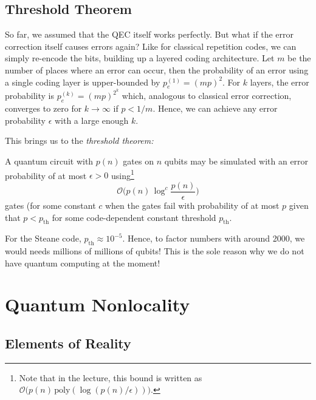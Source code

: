 	\section{Threshold Theorem}
		So far, we assumed that the \ac{QEC} itself works perfectly. But what if the error correction itself causes errors again? Like for classical repetition codes, we can simply re-encode the bits, building up a layered coding architecture. Let \(m\) be the number of places where an error can occur, then the probability of an error using a single coding layer is upper-bounded by \( p_e^{(1)} = (mp)^2 \). For \(k\) layers, the error probability is \( p_e^{(k)} = (mp)^{2^k} \) which, analogous to classical error correction, converges to zero for \(k \to \infty\) if \(p < 1/m\). Hence, we can achieve any error probability \(\epsilon\) with a large enough \(k\).

		This brings us to the \emph{threshold theorem:}
		\begin{theorem}
			A quantum circuit with \(p(n)\) gates on \(n\) qubits may be simulated with an error probability of at most \(\epsilon > 0\) using\footnote{Note that in the lecture, this bound is written as \( \mathcal{O}\bigl( p(n) \, \mathrm{poly}( \log(p(n)/\epsilon) ) \bigr) \).}
			\begin{equation}
				\mathcal{O}\Biggl( p(n) \, \log^c \frac{p(n)}{\epsilon} \Biggr)
			\end{equation}
			gates (for some constant \(c\) when the gates fail with probability of at most \(p\) given that \(p < p_\mathrm{th}\) for some code-dependent constant threshold \(p_\mathrm{th}\).
		\end{theorem}
		For the Steane code, \( p_\mathrm{th} \approx 10^{-5} \). Hence, to factor numbers with around \num{2000}, we would needs millions of millions of qubits! This is the sole reason why we do not have quantum computing at the moment!

\chapter{Quantum Nonlocality} %
	\label{c:nonlocality}


	\section{Elements of Reality} %

